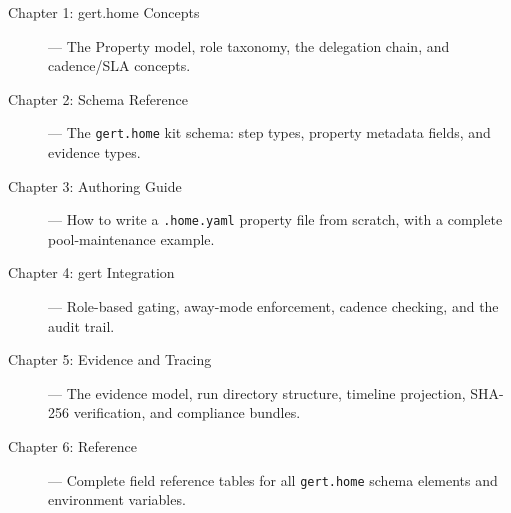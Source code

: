\begin{description}
  \item[Chapter 1: gert.home Concepts] --- The Property model, role taxonomy, the
        delegation chain, and cadence/SLA concepts.
  \item[Chapter 2: Schema Reference] --- The \texttt{gert.home} kit schema: step types,
        property metadata fields, and evidence types.
  \item[Chapter 3: Authoring Guide] --- How to write a \texttt{.home.yaml} property file
        from scratch, with a complete pool-maintenance example.
  \item[Chapter 4: gert Integration] --- Role-based gating, away-mode enforcement, cadence
        checking, and the audit trail.
  \item[Chapter 5: Evidence and Tracing] --- The evidence model, run directory structure,
        timeline projection, SHA-256 verification, and compliance bundles.
  \item[Chapter 6: Reference] --- Complete field reference tables for all
        \texttt{gert.home} schema elements and environment variables.
\end{description}
